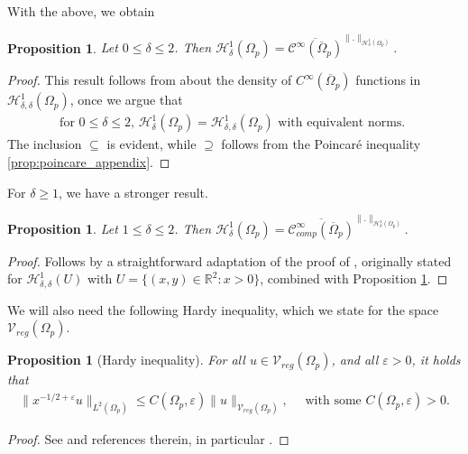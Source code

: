 \documentclass[report]{elsarticle}
\newtheorem{proposition}[theorem]{Proposition}
\numberwithin{theorem}{section}
\newcommand{\re}{\varepsilon}
\begin{document}
With the above, we obtain
\begin{proposition}
	\label{prop:density_smooth}
	Let $0\leq \delta\leq 2$. Then ${\mathcal{H}}^1_{\delta}(\Omega_p)=\overline{\mathcal{C}^{\infty}(\overline{\Omega}_p)}^{\|.\|_{{\mathcal{H}}^1_{\delta}(\Omega_p)}}$.%
\end{proposition}
\begin{proof}
		This result follows from \cite[Theorem 7.2]{kufner} about  the density of $C^{\infty}(\overline{\Omega}_p)$ functions in $\mathcal{H}^1_{\delta,\delta}(\Omega_p)$, once we argue that 
		\begin{align}
			\label{eq:h1delta}
		\text{for $0\leq \delta\leq 2$, }	\mathcal{H}^1_{\delta}(\Omega_p)=\mathcal{H}^1_{\delta,\delta}(\Omega_p) \text{ with equivalent norms. }
		\end{align}
The inclusion $\subseteq$ is evident, while $\supseteq$ follows from the Poincar\'e inequality \ref{prop:poincare_appendix}.
\end{proof}
For $\delta\geq 1$, we have a stronger result. 
\begin{proposition}
	\label{prop:density_vreg}
	Let $1\leq \delta\leq 2$. Then $\mathcal{H}^1_{\delta}(\Omega_p)=\overline{\mathcal{C}^{\infty}_{comp}(\overline{\Omega}_p)}^{\|.\|_{\mathcal{H}^1_{\delta}(\Omega_p)}}.$
\end{proposition}
\begin{proof}
Follows by a straightforward adaptation of the proof of \cite[Theorem 1.1]{grisvard}, originally stated for $\mathcal{H}^1_{\delta,\delta}(U)$ with $U=\{(x,y)\in \mathbb{R}^2: x>0\}$, combined with Proposition \ref{prop:density_smooth}.
\end{proof}
We will also need the following Hardy inequality, which we state for the space $\mathcal{V}_{reg}(\Omega_p)$.
\begin{proposition}[Hardy inequality]
	\label{prop:hardy}
	For all $u\in \mathcal{V}_{reg}(\Omega_p)$, and all $\varepsilon>0$, it holds that 
	\begin{align*}
		\|x^{-1/2+\varepsilon}u\|_{L^2(\Omega_p)}\leq C(\Omega_p,\varepsilon)  \|u\|_{\mathcal{V}_{reg}(\Omega_p)},\quad \text{ with some }C(\Omega_p, \re)>0.
	\end{align*}
\end{proposition}
\begin{proof}
	See \cite[Lemma 6]{nguyen} and references therein, in particular \cite[Theorem 1.5]{necas}.
\end{proof}
\end{document}
